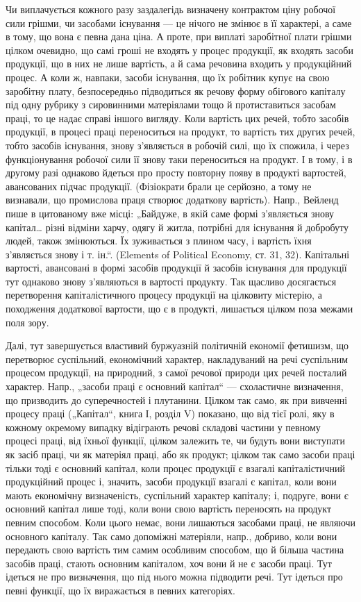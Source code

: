 Чи виплачується кожного разу заздалегідь визначену контрактом ціну
робочої сили грішми, чи засобами існування — це нічого не змінює в її
характері, а саме в тому, що вона є певна дана ціна. А проте, при виплаті
заробітної плати грішми цілком очевидно, що самі гроші не входять
у процес продукції, як входять засоби продукції, що в них не лише
вартість, а й сама речовина входить у продукційний процес. А коли ж,
навпаки, засоби існування, що їх робітник купує на свою заробітну плату,
безпосередньо підводиться як речову форму обігового капіталу під
одну рубрику з сировинними матеріялами тощо й протиставиться засобам
праці, то це надає справі іншого вигляду. Коли вартість цих речей,
тобто засобів продукції, в процесі праці переноситься на продукт, то
вартість тих других речей, тобто засобів існування, знову з’являється в
робочій силі, що їх спожила, і через функціонування робочої сили її знову
таки переноситься на продукт. І в тому, і в другому разі однаково
йдеться про просту повторну появу в продукті вартостей, авансованих
підчас продукції. (Фізіократи брали це серйозно, а тому не визнавали,
що промислова праця створює додаткову вартість). Напр., Вейленд
пише в цитованому вже місці: „Байдуже, в якій саме формі з’являється
знову капітал\dots{} різні відміни харчу, одягу й житла, потрібні для існування
й добробуту людей, також змінюються. Їх зуживається з плином
часу, і вартість їхня з’являється знову і т. ін.“. (Elements of Political
Economy, ст. 31, 32). Капітальні вартості, авансовані в формі
засобів продукції й засобів існування для продукції тут однаково знову
з’являються в вартості продукту. Так щасливо досягається перетворення
капіталістичного процесу продукції на цілковиту містерію, а походження
додаткової вартости, що є в продукті, лишається цілком поза
межами поля зору.

Далі, тут завершується властивий буржуазній політичній економії фетишизм,
що перетворює суспільний, економічний характер, накладуваний
на речі суспільним процесом продукції, на природний, з самої речової
природи цих речей посталий характер. Напр., „засоби праці є основний
капітал“ — схоластичне визначення, що призводить до суперечностей і плутанини.
Цілком так само, як при вивченні процесу праці („Капітал“, книга
І, розділ V) показано, що від тієї ролі, яку в кожному окремому
випадку відіграють речові складові частини у певному процесі праці,
від їхньої функції, цілком залежить те, чи будуть вони виступати як
засіб праці, чи як матеріял праці, або як продукт; цілком так само засоби
праці тільки тоді є основний капітал, коли процес продукції є взагалі
капіталістичний продукційний процес і, значить, засоби продукції
взагалі є капітал, коли вони мають економічну визначеність, суспільний
характер капіталу; і, подруге, вони є основний капітал лише тоді, коли
вони свою вартість переносять на продукт певним способом. Коли цього
немає, вони лишаються засобами праці, не являючи основного капіталу.
Так само допоміжні матеріяли, напр., добриво, коли вони передають
свою вартість тим самим особливим способом, що й більша частина засобів
праці, стають основним капіталом, хоч вони й не є засоби праці.
Тут ідеться не про визначення, що під нього можна підводити речі. Тут
ідеться про певні функції, що їх виражається в певних категоріях.

